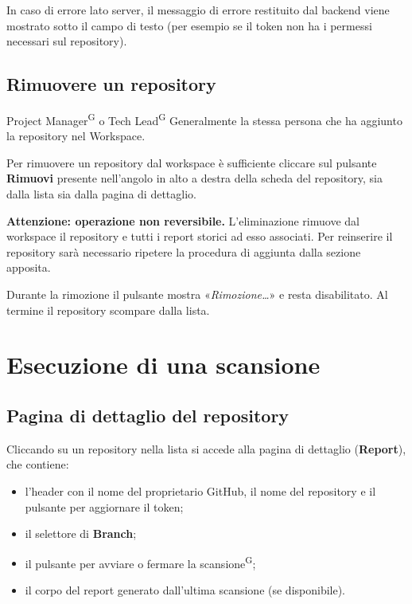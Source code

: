 \documentclass[a4paper, 11pt]{article}
\begin{document}
\noindent In caso di errore lato server, il messaggio di errore restituito dal backend viene mostrato sotto il campo di testo (per esempio se il token non ha i permessi necessari sul repository).

\subsection{Rimuovere un repository}

\begin{rolebox}{Project Manager\textsuperscript{G} o Tech Lead\textsuperscript{G}}
Generalmente la stessa persona che ha aggiunto la repository nel Workspace.
\end{rolebox}

\noindent Per rimuovere un repository dal workspace è sufficiente cliccare sul pulsante \textbf{Rimuovi} presente nell'angolo in alto a destra della scheda del repository, sia dalla lista sia dalla pagina di dettaglio.

\begin{warnbox}
\textbf{Attenzione: operazione non reversibile.} L'eliminazione rimuove dal workspace il repository e tutti i report storici ad esso associati. Per reinserire il repository sarà necessario ripetere la procedura di aggiunta dalla sezione apposita.
\end{warnbox}

\noindent Durante la rimozione il pulsante mostra «\textit{Rimozione\ldots}» e resta disabilitato. Al termine il repository scompare dalla lista.

\newpage
\section{Esecuzione di una scansione}

\subsection{Pagina di dettaglio del repository}
Cliccando su un repository nella lista si accede alla pagina di dettaglio (\textbf{Report}), che contiene:
\begin{itemize}
    \item l'header con il nome del proprietario GitHub, il nome del repository e il pulsante per aggiornare il token;
    \item il selettore di \textbf{Branch};
    \item il pulsante per avviare o fermare la scansione\textsuperscript{G};
    \item il corpo del report generato dall'ultima scansione (se disponibile).
\end{itemize}
\end{document}
